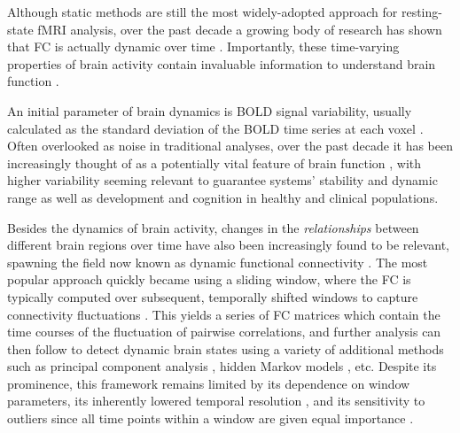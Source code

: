 Although static methods are still the most widely-adopted approach for resting-state fMRI analysis, over the past decade a growing body of research has shown that FC is actually dynamic over time \citep{Chang2010}. Importantly, these time-varying properties of brain activity contain invaluable information to understand brain function \citep{Hutchison2013, Christoff2016}.

An initial parameter of brain dynamics is BOLD signal variability, usually calculated as the standard deviation of the BOLD time series at each voxel \citep{McIntosh2010}. Often overlooked as noise in traditional analyses, over the past decade it has been increasingly thought of as a potentially vital feature of brain function \citep{Garrett2010}, with higher variability seeming relevant to guarantee systems' stability and dynamic range \citep{Deco2011} as well as development and cognition in healthy \citep{Garrett2013} and clinical \citep{Zoller2017, Nomi2018, Easson2019} populations.

Besides the dynamics of brain activity, changes in the \textit{relationships} between different brain regions over time have also been increasingly found to be relevant, spawning the field now known as dynamic functional connectivity \citep{Hutchison2013, Preti2017}. The most popular approach quickly became using a sliding window, where the FC is typically computed over subsequent, temporally shifted windows to capture connectivity fluctuations \citep{Chang2010, Sakoglu2010, Kucyi2014}. This yields a series of FC matrices which contain the time courses of the fluctuation of pairwise correlations, and further analysis can then follow to detect dynamic brain states using a variety of additional methods such as principal component analysis \citep{Leonardi2013}, hidden Markov models \citep{Vidaurre2017}, etc. Despite its prominence, this framework remains limited by its dependence on window parameters, its inherently lowered temporal resolution \cite{Leonardi2015}, and its sensitivity to outliers since all time points within a window are given equal importance \cite{Lindquist2014}.

